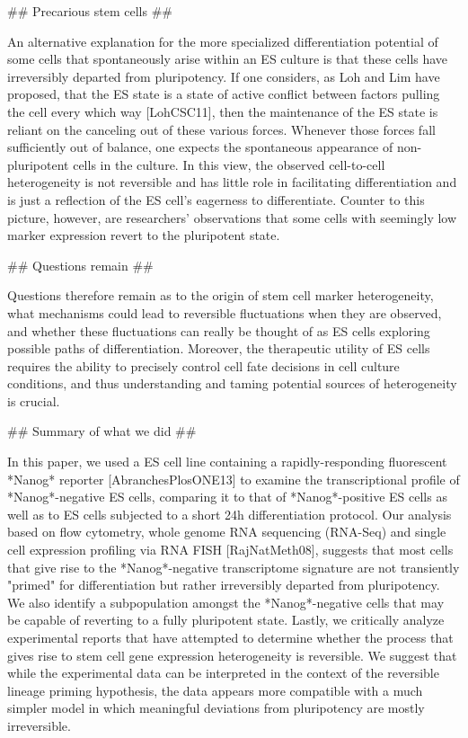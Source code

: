 \documentclass[aps,prl,twocolumn,superscriptaddress]{revtex4}
\begin{document}
 
## Precarious stem cells ##

An alternative explanation for the more specialized differentiation potential of some cells that spontaneously arise within an ES culture is that these cells have irreversibly departed from pluripotency. If one considers, as Loh and Lim have proposed, that the ES state is a state of active conflict between factors pulling the cell every which way [LohCSC11], then the maintenance of the ES state is reliant on the canceling out of these various forces. Whenever those forces fall sufficiently out of balance, one expects the spontaneous appearance of non-pluripotent cells in the culture. In this view, the observed cell-to-cell heterogeneity is not reversible and has little role in facilitating differentiation and is just a reflection of the ES cell's eagerness to differentiate. 
Counter to this picture, however, are researchers' observations that some cells with seemingly low marker expression revert to the pluripotent state.

## Questions remain ##

Questions therefore remain as to the origin of stem cell marker heterogeneity, what mechanisms could lead to reversible fluctuations when they are observed, and whether these fluctuations can really be thought of as ES cells exploring possible paths of differentiation. Moreover, the therapeutic utility of ES cells requires the ability to precisely control cell fate decisions in cell culture conditions, and thus understanding and taming potential sources of heterogeneity is crucial. 

## Summary of what we did ##

In this paper, we used a ES cell line containing a rapidly-responding fluorescent *Nanog* reporter [AbranchesPlosONE13] to examine the transcriptional profile of *Nanog*-negative ES cells, comparing it to that of *Nanog*-positive ES cells as well as to ES cells subjected to a short 24h differentiation protocol. Our analysis based on flow cytometry, whole genome RNA sequencing (RNA-Seq) and single cell expression profiling via RNA FISH [RajNatMeth08], suggests that most cells that give rise to the *Nanog*-negative transcriptome signature are not transiently "primed" for differentiation but rather irreversibly departed from pluripotency. We also identify a subpopulation amongst the  *Nanog*-negative cells that may be capable of reverting to a fully pluripotent state. Lastly, we critically analyze experimental reports that have attempted to determine whether the process that gives rise to stem cell gene expression heterogeneity is reversible. We suggest that while the experimental data can be interpreted in the context of the reversible lineage priming hypothesis, the data appears more compatible with a much simpler model in which meaningful deviations from pluripotency are mostly irreversible. 
\end{document}
